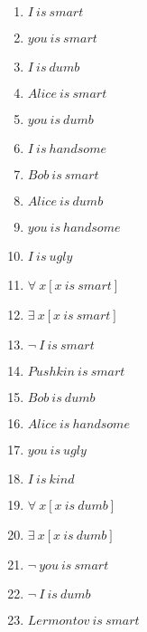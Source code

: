 \documentclass{article}
\begin{document}
\begin{enumerate}

\item $I \ is \ smart$

\item $you \ is \ smart$

\item $I \ is \ dumb$

\item $Alice \ is \ smart$

\item $you \ is \ dumb$

\item $I \ is \ handsome$

\item $Bob \ is \ smart$

\item $Alice \ is \ dumb$

\item $you \ is \ handsome$

\item $I \ is \ ugly$

\item $\forall \ x[x \ is \ smart]$

\item $\exists \ x[x \ is \ smart]$

\item $\neg \ I \ is \ smart$

\item $Pushkin \ is \ smart$

\item $Bob \ is \ dumb$

\item $Alice \ is \ handsome$

\item $you \ is \ ugly$

\item $I \ is \ kind$

\item $\forall \ x[x \ is \ dumb]$

\item $\exists \ x[x \ is \ dumb]$

\item $\neg \ you \ is \ smart$

\item $\neg \ I \ is \ dumb$

\item $Lermontov \ is \ smart$


\end{enumerate}
\end{document}
